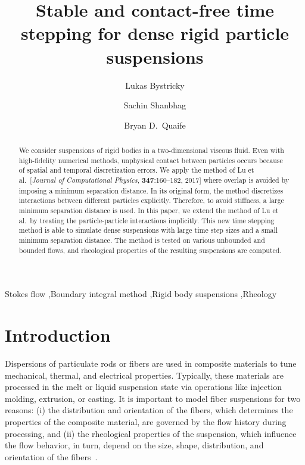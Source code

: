 \documentclass[preprint, 10pt]{elsarticle}
\begin{document}
\title{Stable and contact-free time stepping for dense rigid particle
suspensions}

\author[Lukas]{Lukas Bystricky}
\author[Lukas]{Sachin Shanbhag}
\author[Bryan]{Bryan D.~Quaife}
\address[Lukas]{Department of Scientific Computing, Florida State University,
Tallahassee, FL, 32306.}
\address[Bryan]{Department of Scientific Computing and Geophysical Fluid
Dynamics Institute, Florida State University, Tallahassee, FL, 32306.}

\begin{abstract} 
We consider suspensions of rigid bodies in a two-dimensional viscous
fluid. Even with high-fidelity numerical methods, unphysical contact
between particles occurs because of spatial and temporal discretization
errors.  We apply the method of Lu et al.~[{\em Journal of Computational
Physics}, {\bf 347}:160--182, 2017] where overlap is avoided by
imposing a minimum separation distance.  In its original form, the
method discretizes interactions between different particles explicitly.
Therefore, to avoid stiffness, a large minimum separation distance is
used.  In this paper, we extend the method of Lu et al.~by treating the
particle-particle interactions implicitly.  This new time stepping
method is able to simulate dense suspensions with large time step sizes
and a small minimum separation distance.  The method is tested on
various unbounded and bounded flows, and rheological properties of the
resulting suspensions are computed.

\end{abstract}

\begin{keyword}
  Stokes flow \sep Boundary integral method \sep Rigid body suspensions
  \sep Rheology 
\end{keyword}

\maketitle


\section{Introduction\label{s:intro}}
Dispersions of particulate rods or fibers are used in composite
materials to tune mechanical, thermal, and electrical properties.
Typically, these materials are processed in the melt or liquid
suspension state via operations like injection molding, extrusion, or
casting. It is important to model fiber suspensions for two reasons: (i)
the distribution and orientation of the fibers, which determines the
properties of the composite material, are governed by the flow history
during processing, and (ii) the rheological properties of the
suspension, which influence the flow behavior, in turn, depend on the
size, shape, distribution, and orientation of the
fibers~\cite{larsoncf}.
\end{document}
